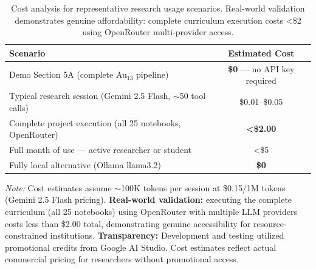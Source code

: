 \begin{table}[htbp]
\centering
\caption{Cost analysis for representative research usage scenarios. Real-world validation demonstrates genuine affordability: complete curriculum execution costs <\$2 using OpenRouter multi-provider access.}
\label{tab:costs}
\small
\begin{tabular}{@{}lc@{}}
\toprule
\textbf{Scenario} & \textbf{Estimated Cost} \\
\midrule
Demo Section 5A (complete Au$_{13}$ pipeline) & \textbf{\$0} — no API key required \\
Typical research session (Gemini 2.5 Flash, $\sim$50 tool calls) & \$0.01–\$0.05 \\
\rowcolor{yellow!20}
Complete project execution (all 25 notebooks, OpenRouter) & \textbf{<\$2.00} \\
Full month of use — active researcher or student & <\$5 \\
Fully local alternative (Ollama llama3.2) & \textbf{\$0} \\
\bottomrule
\end{tabular}

\vspace{0.3cm}
\footnotesize
\textit{Note:} Cost estimates assume $\sim$100K tokens per session at \$0.15/1M tokens (Gemini 2.5 Flash pricing). \textbf{Real-world validation:} executing the complete curriculum (all 25 notebooks) using OpenRouter with multiple LLM providers costs less than \$2.00 total, demonstrating genuine accessibility for resource-constrained institutions. \textbf{Transparency:} Development and testing utilized promotional credits from Google AI Studio. Cost estimates reflect actual commercial pricing for researchers without promotional access.
\end{table}
